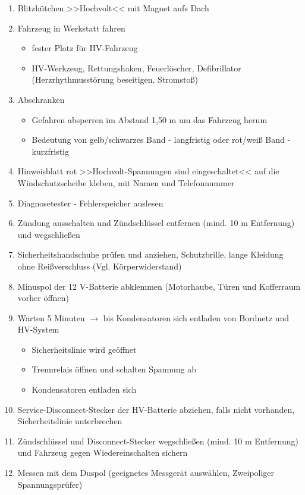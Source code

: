 \begin{enumerate}
\item
  Blitzhütchen >>Hochvolt<< mit Magnet aufs Dach
\item
  Fahrzeug in Werkstatt fahren

  \begin{itemize}
  \item
    fester Platz für HV-Fahrzeug
  \item
    HV-Werkzeug, Rettungshaken, Feuerlöscher, Defibrillator
    (Herzrhythmusstörung beseitigen, Stromstoß)
  \end{itemize}
\item
  Abschranken

  \begin{itemize}
  \item
    Gefahren absperren im Abstand 1,50 m um das Fahrzeug herum
  \item
    Bedeutung von gelb/schwarzes Band - langfristig oder rot/weiß Band -
    kurzfristig
  \end{itemize}
\item
  Hinweisblatt rot >>Hochvolt-Spannungen sind eingeschaltet<< auf die
  Windschutzscheibe kleben, mit Namen und Telefonnummer
\item
  Diagnosetester - Fehlerspeicher auslesen
\item
  Zündung ausschalten und Zündschlüssel entfernen (mind. 10 m
  Entfernung) und wegschließen
\item
  Sicherheitshandschuhe prüfen und anziehen, Schutzbrille, lange
  Kleidung ohne Reißverschluss (Vgl. Körperwiderstand)
\item
  Minuspol der 12 V-Batterie abklemmen (Motorhaube, Türen und Kofferraum
  vorher öffnen)
\item
  Warten 5 Minuten $\to$ bis Kondensatoren sich entladen von Bordnetz
  und HV-System

  \begin{itemize}
  \item
    Sicherheitslinie wird geöffnet
  \item
    Trennrelais öffnen und schalten Spannung ab
  \item
    Kondensatoren entladen sich
  \end{itemize}
\item
  Service-Disconnect-Stecker der HV-Batterie abziehen, falls nicht
  vorhanden, Sicherheitslinie unterbrechen
\item
  Zündschlüssel und Disconnect-Stecker wegschließen (mind. 10 m
  Entfernung) und Fahrzeug gegen Wiedereinschalten sichern
\item
  Messen mit dem Duspol (geeignetes Messgerät auswählen, Zweipoliger
  Spannungsprüfer)


\end{enumerate}
